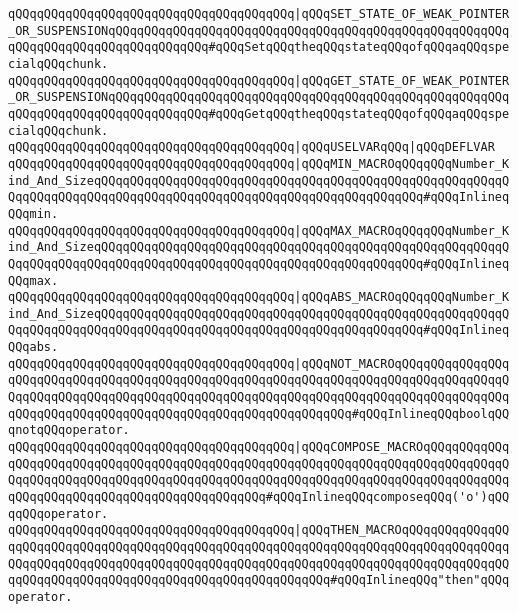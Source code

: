 \verb|qQQqqQQqqQQqqQQqqQQqqQQqqQQqqQQqqQQqqQQq|\verb#|qQQqSET_STATE_OF_WEAK_POINTER_OR_SUSPENSIONqQQqqQQqqQQqqQQqqQQqqQQqqQQqqQQqqQQqqQQqqQQqqQQqqQQqqQQqqQQqqQQqqQQqqQQqqQQqqQQqqQQq#\verb|#qQQqSetqQQqtheqQQqstateqQQqofqQQqaqQQqspecialqQQqchunk.|\newline
\verb|qQQqqQQqqQQqqQQqqQQqqQQqqQQqqQQqqQQqqQQq|\verb#|qQQqGET_STATE_OF_WEAK_POINTER_OR_SUSPENSIONqQQqqQQqqQQqqQQqqQQqqQQqqQQqqQQqqQQqqQQqqQQqqQQqqQQqqQQqqQQqqQQqqQQqqQQqqQQqqQQqqQQq#\verb|#qQQqGetqQQqtheqQQqstateqQQqofqQQqaqQQqspecialqQQqchunk.|\newline
\verb|qQQqqQQqqQQqqQQqqQQqqQQqqQQqqQQqqQQqqQQq|\verb#|qQQqUSELVARqQQq|qQQqDEFLVAR#\newline
\verb|qQQqqQQqqQQqqQQqqQQqqQQqqQQqqQQqqQQqqQQq|\verb#|qQQqMIN_MACROqQQqqQQqNumber_Kind_And_SizeqQQqqQQqqQQqqQQqqQQqqQQqqQQqqQQqqQQqqQQqqQQqqQQqqQQqqQQqqQQqqQQqqQQqqQQqqQQqqQQqqQQqqQQqqQQqqQQqqQQqqQQqqQQqqQQqqQQq#\verb|#qQQqInlineqQQqmin.|\newline
\verb|qQQqqQQqqQQqqQQqqQQqqQQqqQQqqQQqqQQqqQQq|\verb#|qQQqMAX_MACROqQQqqQQqNumber_Kind_And_SizeqQQqqQQqqQQqqQQqqQQqqQQqqQQqqQQqqQQqqQQqqQQqqQQqqQQqqQQqqQQqqQQqqQQqqQQqqQQqqQQqqQQqqQQqqQQqqQQqqQQqqQQqqQQqqQQqqQQq#\verb|#qQQqInlineqQQqmax.|\newline
\verb|qQQqqQQqqQQqqQQqqQQqqQQqqQQqqQQqqQQqqQQq|\verb#|qQQqABS_MACROqQQqqQQqNumber_Kind_And_SizeqQQqqQQqqQQqqQQqqQQqqQQqqQQqqQQqqQQqqQQqqQQqqQQqqQQqqQQqqQQqqQQqqQQqqQQqqQQqqQQqqQQqqQQqqQQqqQQqqQQqqQQqqQQqqQQqqQQq#\verb|#qQQqInlineqQQqabs.|\newline
\verb|qQQqqQQqqQQqqQQqqQQqqQQqqQQqqQQqqQQqqQQq|\verb#|qQQqNOT_MACROqQQqqQQqqQQqqQQqqQQqqQQqqQQqqQQqqQQqqQQqqQQqqQQqqQQqqQQqqQQqqQQqqQQqqQQqqQQqqQQqqQQqqQQqqQQqqQQqqQQqqQQqqQQqqQQqqQQqqQQqqQQqqQQqqQQqqQQqqQQqqQQqqQQqqQQqqQQqqQQqqQQqqQQqqQQqqQQqqQQqqQQqqQQqqQQqqQQqqQQqqQQq#\verb|#qQQqInlineqQQqboolqQQqnotqQQqoperator.|\newline
\verb|qQQqqQQqqQQqqQQqqQQqqQQqqQQqqQQqqQQqqQQq|\verb#|qQQqCOMPOSE_MACROqQQqqQQqqQQqqQQqqQQqqQQqqQQqqQQqqQQqqQQqqQQqqQQqqQQqqQQqqQQqqQQqqQQqqQQqqQQqqQQqqQQqqQQqqQQqqQQqqQQqqQQqqQQqqQQqqQQqqQQqqQQqqQQqqQQqqQQqqQQqqQQqqQQqqQQqqQQqqQQqqQQqqQQqqQQqqQQqqQQqqQQqqQQq#\verb|#qQQqInlineqQQqcomposeqQQq('o')qQQqqQQqoperator.|\newline
\verb|qQQqqQQqqQQqqQQqqQQqqQQqqQQqqQQqqQQqqQQq|\verb#|qQQqTHEN_MACROqQQqqQQqqQQqqQQqqQQqqQQqqQQqqQQqqQQqqQQqqQQqqQQqqQQqqQQqqQQqqQQqqQQqqQQqqQQqqQQqqQQqqQQqqQQqqQQqqQQqqQQqqQQqqQQqqQQqqQQqqQQqqQQqqQQqqQQqqQQqqQQqqQQqqQQqqQQqqQQqqQQqqQQqqQQqqQQqqQQqqQQqqQQqqQQqqQQqqQQq#\verb|#qQQqInlineqQQq"then"qQQqoperator.|\newline
